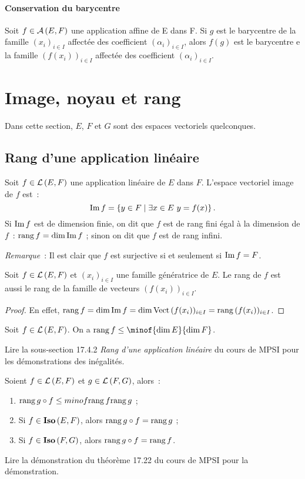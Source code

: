 \paragraph{Conservation du barycentre}
\begin{prop}
	Soit $f \in \mathcal{A}\left(E,F\right)$ une application affine de E dans F. Si $g$ est le barycentre de la famille $(x_i)_{i \in I}$ affectée des coefficient $(\alpha_i)_{i \in I}$, alors $f(g)$ est le barycentre e la famille $(f(x_i))_{i \in I}$ affectée des coefficient $(\alpha_i)_{i \in I}$.
\end{prop}
\section{Image, noyau et rang}

Dans cette section, $E$, $F$ et $G$ sont des espaces vectoriels quelconques.
\subsection{Rang d'une application linéaire}
\begin{defdef}
	Soit $f \in \mathcal{L}\left(E,F\right)$ une application linéaire de $E$ dans $F$. L'espace vectoriel image de $f$ est~:
	\begin{equation}
		\operatorname{Im}{f} = \left\{y \in F\mathrel{}\middle|\mathrel{}\exists x \in E \ y=f(x)\right\}.
	\end{equation}
	Si $\operatorname{Im}{f}$ est de dimension finie, on dit que $f$ est de rang fini égal à la dimension de $f$~: $\operatorname{rang}{f} = \dim{\operatorname{Im}{f}}$ ; sinon on dit que $f$ est de rang infini.
\end{defdef}

\emph{Remarque}~: Il est clair que $f$ est surjective si et seulement si $\operatorname{Im}{f}=F$.

\begin{prop}
	Soit $f \in \mathcal{L}\left(E,F\right)$ et $(x_i)_{i \in I}$ une famille génératrice de $E$. Le rang de $f$ est aussi le rang de la famille de vecteurs $(f(x_i))_{i \in I}$.
\end{prop}
\begin{proof}
	En effet, $\operatorname{rang}{f} = \operatorname{dim}{\operatorname{Im}{f}} = \operatorname{dim}{\operatorname{Vect}{(f(x_i))_{i \in I}}} = \operatorname{rang}{(f(x_i))_{i \in I}}$.
\end{proof}
\begin{prop}
	Soit $f \in \mathcal{L}\left(E,F\right)$. On a $\rg{f} \leq \minof{\Dim{E}}{\Dim{F}}$.
\end{prop}
Lire la sous-section 17.4.2 \emph{Rang d’une application linéaire} du cours de MPSI pour les démonstrations des inégalités.
\begin{prop}
	Soient $f \in \mathcal{L}\left(E,F\right)$ et $g \in \mathcal{L}\left(F,G\right)$, alors~:
	\begin{enumerate}
		\item $\operatorname{rang}{g \circ f} \leq minof{\operatorname{rang}{f}}{\operatorname{rang}{g}}$ ;
		\item Si $f \in \mathbf{Iso}\left(E,F\right)$, alors $\operatorname{rang}{g \circ f} = \operatorname{rang}{g}$ ;
		\item Si $f \in \mathbf{Iso}\left(F,G\right)$, alors $\operatorname{rang}{g \circ f} = \operatorname{rang}{f}$.
	\end{enumerate}
\end{prop}
Lire la démonstration du théorème 17.22 du cours de MPSI pour la démonstration.
